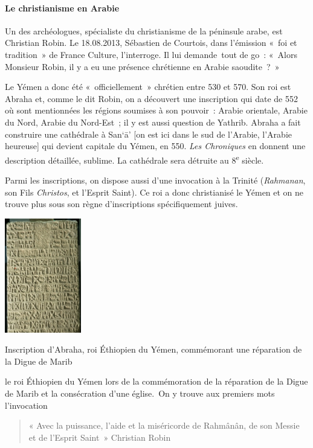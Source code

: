  



\paragraph{Le christianisme en
Arabie}

Un des archéologues, spécialiste du christianisme de la péninsule arabe,
est Christian Robin. {Le 18.08.2013, Sébastien de Courtois, dans l'émission
«~foi et tradition~» de France Culture, l'interroge. Il lui demande~tout
de go~: «~Alors Monsieur Robin, il y a eu une présence chrétienne en
Arabie
saoudite~?~»} 

Le Yémen a donc été «~officiellement~» chrétien entre 530 et 570. Son
roi est Abraha et, comme le dit Robin, on a découvert une inscription
qui date de 552 où sont mentionnées les régions soumises à son pouvoir~:
Arabie orientale, Arabie du Nord, Arabie du Nord-Est~; il y est aussi
question de Yathrib. Abraha a fait construire une cathédrale à San`ā'
{[}on est ici dans le sud de l'Arabie, l'Arabie heureuse{]} qui devient
capitale du Yémen, en 550. \emph{Les Chroniques} en donnent une
description détaillée, sublime. La cathédrale sera détruite au
8\textsuperscript{e} siècle.

Parmi les inscriptions, on dispose aussi d'une invocation à la Trinité
(\emph{Rahmanan}, son Fils \emph{Christos}, et l'Esprit Saint). Ce roi a
donc christianisé le Yémen et on ne trouve plus sous son règne
d'inscriptions spécifiquement juives.

\begin{marginfigure}
    \centering
    \includegraphics[width=1.31747in,height=1.96757in]{Images/image033.jpg}
    \caption{Inscription d'Abraha, 
    roi Éthiopien du Yémen, commémorant une réparation de la Digue de Marib }

\end{marginfigure}


le roi
Éthiopien du Yémen lors de la commémoration de la réparation de la Digue
de Marib et la consécration d'une église.~On y trouve aux premiers mots
l'invocation~
\begin{quote}
    « Avec la puissance, l'aide et la miséricorde de Rahmânân,
de son Messie et de l'Esprit Saint~» 
Christian Robin
\end{quote}

